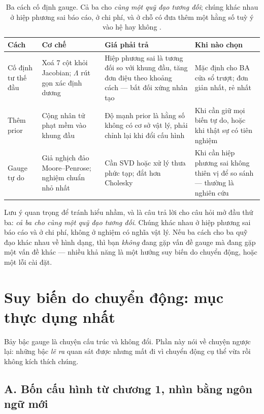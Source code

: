 \documentclass[../../vslam.tex]{subfiles}
\begin{document}
\begin{table}[H]\centering\small
\caption{Ba cách cố định gauge. Cả ba cho \emph{cùng một quỹ đạo tương đối}; chúng khác nhau ở hiệp phương sai báo cáo, ở chi phí, và ở chỗ có đưa thêm một hằng số tuỳ ý vào hệ hay không \cite{zhang2018gaugeba}.}
\label{tab:a05-gauge}
\begin{tabularx}{\linewidth}{@{}L{2.4cm}YYL{2.4cm}@{}}
\toprule
\textbf{Cách} & \textbf{Cơ chế} & \textbf{Giá phải trả} & \textbf{Khi nào chọn}\\
\midrule
Cố định tư thế đầu & Xoá 7 cột khỏi Jacobian; \(\Lambda\) rút gọn xác định dương & Hiệp phương sai là tương đối so với khung đầu, tăng đơn điệu theo khoảng cách --- bất đối xứng nhân tạo & Mặc định cho BA cửa sổ trượt; đơn giản nhất, rẻ nhất\\
Thêm prior & Cộng nhân tử phạt mềm vào khung đầu & Độ mạnh prior là hằng số không có cơ sở vật lý, phải chỉnh lại khi đổi cấu hình & Khi cần giữ mọi biến tự do, hoặc khi thật sự có tiên nghiệm\\
Gauge tự do & Giả nghịch đảo Moore--Penrose; nghiệm chuẩn nhỏ nhất & Cần SVD hoặc xử lý thưa phức tạp; đắt hơn Cholesky & Khi cần hiệp phương sai không thiên vị để so sánh --- thường là nghiên cứu\\
\bottomrule
\end{tabularx}
\end{table}

Lưu ý quan trọng để tránh hiểu nhầm, và là câu trả lời cho câu hỏi mở đầu thứ ba: \emph{cả ba cho cùng một quỹ đạo tương đối}. Chúng khác nhau ở hiệp phương sai báo cáo và ở chi phí, không ở nghiệm có nghĩa vật lý. Nếu ba cách cho ba quỹ đạo khác nhau về hình dạng, thì bạn \emph{không} đang gặp vấn đề gauge mà đang gặp một vấn đề khác --- nhiều khả năng là một hướng suy biến do chuyển động, hoặc một lỗi cài đặt.

\section{Suy biến do chuyển động: mục thực dụng nhất}

Bảy bậc gauge là chuyện cấu trúc và không đổi. Phần này nói về chuyện ngược lại: những bậc \emph{lẽ ra} quan sát được nhưng mất đi vì chuyển động cụ thể vừa rồi không kích thích chúng.

\subsection{A. Bốn cấu hình từ chương 1, nhìn bằng ngôn ngữ mới}
\end{document}

